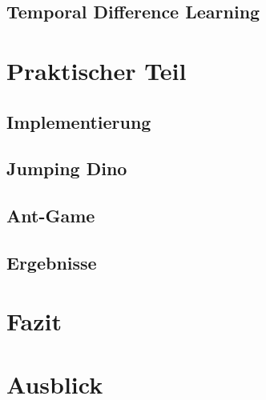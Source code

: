 \documentclass[12pt]{scrartcl}
\numberwithin{equation}{section}
\begin{document}
	\subsection{Temporal Difference Learning}\label{sec:TD}
	

\section{Praktischer Teil}
	
	\subsection{Implementierung}
	
	\subsection{Jumping Dino}
	
	\subsection{Ant-Game}
	
	\subsection{Ergebnisse}
	
\section{Fazit}
\section{Ausblick}

\pagebreak

\pagebreak


\end{document}
